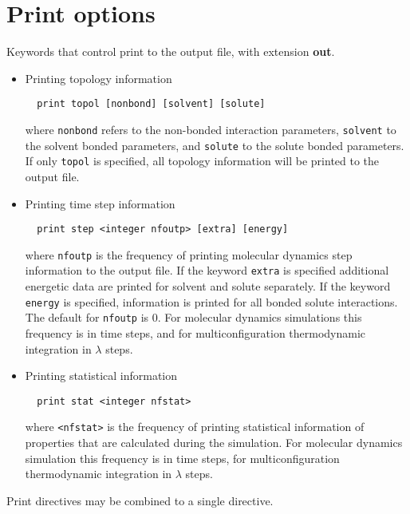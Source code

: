 \section{Print options}
Keywords that control print to the output file, with extension {\bf out}.
\begin{itemize}
\item
Printing topology information
\begin{verbatim}
  print topol [nonbond] [solvent] [solute]
\end{verbatim}
where {\tt nonbond} refers to the non-bonded interaction parameters,
{\tt solvent} to the solvent bonded parameters, and {\tt solute} to the
solute bonded parameters. If only {\tt topol} is specified, all
topology information will be printed to the output file.
\item
Printing time step information
\begin{verbatim}
  print step <integer nfoutp> [extra] [energy]
\end{verbatim}
where \verb+nfoutp+ is the frequency of printing molecular dynamics step
information to the output file. If the keyword {\tt extra} is specified
additional energetic data are printed for solvent and solute separately.
If the keyword {\tt energy} is specified, information is printed for
all bonded solute interactions.
The default for \verb+nfoutp+ is 0. For molecular dynamics simulations
this frequency is in time steps, and for multiconfiguration thermodynamic
integration in $\lambda$ steps.
\item
Printing statistical information
\begin{verbatim}
  print stat <integer nfstat>
\end{verbatim}
where \verb+<nfstat>+ is the frequency of printing statistical information
of properties that are calculated during the simulation. 
For molecular dynamics simulation
this frequency is in time steps, for multiconfiguration thermodynamic
integration in $\lambda$ steps.
\end{itemize}
Print directives may be combined to a single directive.

